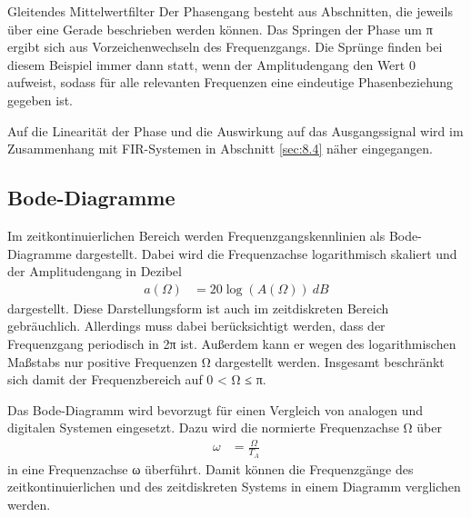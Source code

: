 \begin{example}{Gleitendes Mittelwertfilter}
Der Phasengang besteht aus Abschnitten, die jeweils über eine Gerade beschrieben werden können. Das Springen der Phase um π ergibt sich aus Vorzeichenwechseln des Frequenzgangs. Die Sprünge finden bei diesem Beispiel immer dann statt, wenn der Amplitudengang den Wert 0 aufweist, sodass für alle relevanten Frequenzen eine eindeutige Phasenbeziehung gegeben ist.

Auf die Linearität der Phase und die Auswirkung auf das Ausgangssignal wird im Zusammenhang mit FIR-Systemen in Abschnitt \ref{sec:8.4} näher eingegangen.

\end{example}

\subsection{Bode-Diagramme}\label{sec:bode-diagramme}

Im zeitkontinuierlichen Bereich werden Frequenzgangskennlinien als Bode-Diagramme dargestellt. Dabei wird die Frequenzachse logarithmisch skaliert und der Amplitudengang in Dezibel
\begin{align}
a(\Omega) &= 20  \log\left( A(\Omega) \right)\ dB \label{eq:8.37}
\end{align}
dargestellt. Diese Darstellungsform ist auch im zeitdiskreten Bereich gebräuchlich. Allerdings muss dabei berücksichtigt werden, dass der Frequenzgang periodisch in 2π ist. Außerdem kann er wegen des logarithmischen Maßstabs nur positive Frequenzen Ω dargestellt werden. Insgesamt beschränkt sich damit der Frequenzbereich auf 0 \textless{} Ω ≤ π.

Das Bode-Diagramm wird bevorzugt für einen Vergleich von analogen und digitalen Systemen eingesetzt. Dazu wird die normierte Frequenzachse Ω über
\begin{align}
\omega &= \frac{\Omega}{T_{A}} \label{eq:8.38}
\end{align}
in eine Frequenzachse ω überführt. Damit können die Frequenzgänge des zeitkontinuierlichen und des zeitdiskreten Systems in einem Diagramm verglichen werden.

